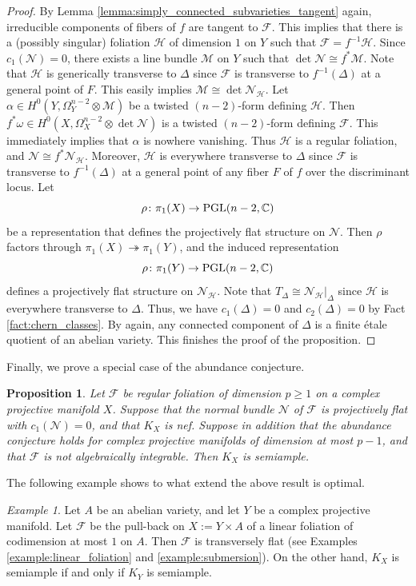 \documentclass[english,10pt]{amsart}
\renewcommand{\ge}{\geqslant}
\newcommand{\cF}{\mathcal{F}}
\newcommand{\cH}{\mathcal{H}}
\newcommand{\sM}{\mathscr{M}}
\newcommand{\sN}{\mathscr{N}}
\newtheorem{prop}[thm]{Proposition}
\theoremstyle{definition}
\theoremstyle{remark}
\newtheorem{exmp}[thm]{Example}
\numberwithin{equation}{section}
\begin{document}
\begin{proof}
By Lemma \ref{lemma:simply_connected_subvarieties_tangent} again, irreducible components of fibers of $f$ are tangent to $\cF$. This implies that there is a (possibly singular) foliation $\cH$ of dimension $1$ on $Y$ such that $\cF = f^{-1}\cH$. Since $c_1(\sN)=0$, there exists a line bundle $\sM$ on $Y$ such that $\det \sN \cong f^* \sM$. Note that $\cH$ is generically transverse to $\Delta$ since $\cF$ is transverse to $f^{-1}(\Delta)$ at a general point of $F$. This easily implies $\sM \cong \det \sN_\cH$. Let $\alpha \in H^0(Y,\Omega_Y^{n-2}\otimes \sM)$ be a twisted $(n-2)$-form defining $\cH$. Then $f^*\omega \in H^0(X,\Omega_X^{n-2}\otimes \det \sN)$ is a twisted $(n-2)$-form defining $\cF$. This immediately implies that $\alpha$ is nowhere vanishing. Thus $\cH$ is a regular foliation, and $\sN\cong f^*\sN_\cH$. Moreover, $\cH$ is everywhere transverse to $\Delta$ since $\cF$ is transverse to $f^{-1}(\Delta)$ at a general point of any fiber $F$ of $f$ over the discriminant locus. Let 
\[
\rho \colon \pi_1(X) \to \textup{PGL}(n-2,\mathbb{C})
\]
be a representation that defines the projectively flat structure on $\sN$. Then $\rho$
factors through $\pi_1(X) \twoheadrightarrow \pi_1(Y)$, and the induced representation
\[
\rho \colon \pi_1(Y) \to \textup{PGL}(n-2,\mathbb{C})
\]
defines a projectively flat structure on $\sN_\cH$. 
Note that $T_\Delta \cong \sN_\cH|_\Delta$ since $\cH$ is everywhere transverse to $\Delta$. Thus, we have $c_1(\Delta)=0$ and $c_2(\Delta)=0$ by Fact \ref{fact:chern_classes}.  By \cite[Chapter IV Corollary 4.15]{kobayashi_diff_geom_vb} again, any connected component of $\Delta$ is a finite \'etale quotient of an abelian variety. This finishes the proof of the proposition.
\end{proof}

Finally, we prove a special case of the abundance conjecture.

\begin{prop}\label{prop:abundance}
Let $\cF$ be regular foliation of dimension $p \ge 1$ on a complex projective manifold $X$. Suppose that the normal bundle $\sN$ of $\cF$ is projectively flat with $c_1(\sN)=0$, and that $K_X$ is nef. Suppose in addition that the abundance conjecture holds for complex projective manifolds of dimension at most $p-1$, and that $\cF$ is not algebraically integrable. Then $K_X$ is semiample.
\end{prop}

The following example shows to what extend the above result is optimal.

\begin{exmp}
Let $A$ be an abelian variety, and let $Y$ be a complex projective manifold. Let $\cF$ be the pull-back on $X:=Y \times A$ of a linear foliation of codimension at most $1$ on $A$. Then $\cF$ is transversely flat (see Examples \ref{example:linear_foliation} and \ref{example:submersion}). On the other hand, $K_X$ is semiample if and only if $K_Y$ is semiample.
\end{exmp}
\end{document}
